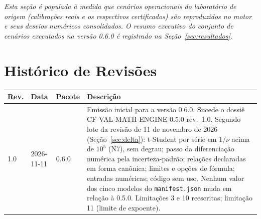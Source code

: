 \documentclass[11pt,a4paper]{article}
\newcommand{\docVersion}{0.6.0}
\newcommand{\docRevision}{1.0}
\newcommand{\reviewDate}{11 de novembro de 2026}
\begin{document}
\vspace{0.3cm}
\textit{Esta seção é populada à medida que cenários operacionais do laboratório de origem (calibrações reais e os respectivos certificados) são reproduzidos no motor e seus desvios numéricos consolidados. O resumo executivo do conjunto de cenários executados na versão \docVersion{} é registrado na Seção~\ref{sec:resultados}.}

\section{Histórico de Revisões}

\begin{tabularx}{\textwidth}{l l l X}
  \toprule
  \textbf{Rev.} & \textbf{Data} & \textbf{Pacote} & \textbf{Descrição} \\
  \midrule
  \docRevision & 2026-11-11 & \docVersion & Emissão inicial para a versão \docVersion{}. Sucede o dossiê CF-VAL-MATH-ENGINE-0.5.0 rev.\ 1.0. Segundo lote da revisão de \reviewDate{} (Seção~\ref{sec:delta}): t-Student por série em \(1/\nu\) acima de \(10^5\) (N7), sem degrau; passo da diferenciação numérica pela incerteza-padrão; relações declaradas em forma canônica; limites e opções de fórmula; entradas numéricas; código sem uso. Nenhum valor dos cinco modelos do \texttt{manifest.json} muda em relação à 0.5.0. Limitações 3 e 10 reescritas; limitação 11 (limite de expoente). \\
  \bottomrule
\end{tabularx}
\end{document}
